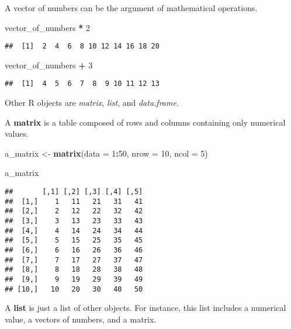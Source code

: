 \documentclass[
]{article}
\newenvironment{Shaded}{\begin{snugshade}}{\end{snugshade}}
\newcommand{\AttributeTok}[1]{\textcolor[rgb]{0.13,0.29,0.53}{#1}}
\newcommand{\DecValTok}[1]{\textcolor[rgb]{0.00,0.00,0.81}{#1}}
\newcommand{\FunctionTok}[1]{\textcolor[rgb]{0.13,0.29,0.53}{\textbf{#1}}}
\newcommand{\NormalTok}[1]{#1}
\newcommand{\OtherTok}[1]{\textcolor[rgb]{0.56,0.35,0.01}{#1}}
\newcommand{\SpecialCharTok}[1]{\textcolor[rgb]{0.81,0.36,0.00}{\textbf{#1}}}
\begin{document}
A vector of numbers can be the argument of mathematical operations.

\begin{Shaded}
\begin{Highlighting}[]
\NormalTok{vector\_of\_numbers }\SpecialCharTok{*} \DecValTok{2}
\end{Highlighting}
\end{Shaded}

\begin{verbatim}
##  [1]  2  4  6  8 10 12 14 16 18 20
\end{verbatim}

\begin{Shaded}
\begin{Highlighting}[]
\NormalTok{vector\_of\_numbers }\SpecialCharTok{+} \DecValTok{3}
\end{Highlighting}
\end{Shaded}

\begin{verbatim}
##  [1]  4  5  6  7  8  9 10 11 12 13
\end{verbatim}

Other R objects are \emph{matrix}, \emph{list}, and \emph{data.frame.}

A \textbf{matrix} is a table composed of rows and columns containing only numerical values.

\begin{Shaded}
\begin{Highlighting}[]
\NormalTok{a\_matrix }\OtherTok{\textless{}{-}} \FunctionTok{matrix}\NormalTok{(}\AttributeTok{data =} \DecValTok{1}\SpecialCharTok{:}\DecValTok{50}\NormalTok{, }\AttributeTok{nrow =} \DecValTok{10}\NormalTok{, }\AttributeTok{ncol =} \DecValTok{5}\NormalTok{)}

\NormalTok{a\_matrix}
\end{Highlighting}
\end{Shaded}

\begin{verbatim}
##       [,1] [,2] [,3] [,4] [,5]
##  [1,]    1   11   21   31   41
##  [2,]    2   12   22   32   42
##  [3,]    3   13   23   33   43
##  [4,]    4   14   24   34   44
##  [5,]    5   15   25   35   45
##  [6,]    6   16   26   36   46
##  [7,]    7   17   27   37   47
##  [8,]    8   18   28   38   48
##  [9,]    9   19   29   39   49
## [10,]   10   20   30   40   50
\end{verbatim}

A \textbf{list} is just a list of other objects.
For instance, this list includes a numerical value, a vectors of numbers, and a matrix.
\end{document}
